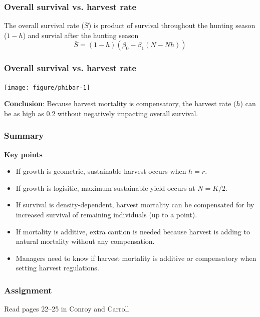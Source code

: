 \documentclass[color=usenames,dvipsnames]{beamer}\usepackage[]{graphicx}\usepackage[]{color}
\begin{document}
\begin{frame}
  \frametitle{Overall survival vs. harvest rate}
  The overall survival rate ($\bar{S}$) is product of survival
  throughout the hunting season ($1-h$) and survial after the hunting
  season
  \Large
  \[
    \bar{S} = (1-h)(\beta_0 - \beta_1 (N - Nh))
  \]
\end{frame}


\begin{frame}[fragile]
  \frametitle{Overall survival vs. harvest rate}
  \vspace{-0.5cm}

\begin{center}
  \texttt{[image: figure/phibar-1]}
\end{center}
\pause
\small
{\bf Conclusion}: Because harvest mortality is compensatory, the
harvest rate ($h$) can be as high as 0.2 without negatively impacting
overall survival.
\end{frame}




\begin{frame}
  \frametitle{Summary}
  {\bf Key points}
  \begin{itemize}
    \item If growth is geometric, sustainable harvest occurs when $h=r$.
    \item If growth is logisitic, maximum sustainable yield occurs at $N=K/2$.
    \item If survival is density-dependent, harvest mortality can be
      compensated for by increased survival of remaining individuals
      (up to a point).
    \item If mortality is additive, extra caution is needed
      because harvest is adding to natural mortality without any
      compensation.
    \item Managers need to know if harvest mortality is additive or
      compensatory when setting harvest regulations.
  \end{itemize}
\end{frame}



\begin{frame}
  \frametitle{Assignment}
  \LARGE \centering
  Read pages 22--25 in Conroy and Carroll
\end{frame}




\end{document}
